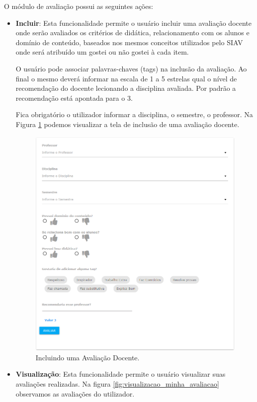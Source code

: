 \documentclass[12pt, a4paper]{report}
\begin{document}
O módulo de avaliação possui as seguintes ações:
\begin{itemize}
\item \textbf{Incluir}: Esta funcionalidade permite o usuário incluir uma avaliação docente onde serão avaliados os critérios de didática, relacionamento com os alunos e domínio de conteúdo, baseados nos mesmos conceitos utilizados pelo SIAV onde será atribuído um gostei ou não gostei à cada item.

O usuário pode associar palavras-chaves (tags) na inclusão da avaliação. Ao final o mesmo deverá informar na escala de 1 a 5 estrelas qual o nível de recomendação do docente lecionando a disciplina avaliada. Por padrão a recomendação está apontada para o 3. 

Fica obrigatório o utilizador informar a disciplina, o semestre, o professor. Na Figura \ref{fig:incluir_avaliacao}  podemos visualizar a tela de inclusão de uma avaliação docente.

\begin{figure}
\centering
\includegraphics[scale=0.5]{incluir_avaliacao.png}
\caption{Incluindo uma Avaliação Docente.}
\label{fig:incluir_avaliacao}
\end{figure}

\item \textbf{Visualização}: Esta funcionalidade permite o usuário visualizar suas avaliações realizadas. Na figura \ref{fig:visualizacao_minha_avaliacao} observamos as avaliações do utilizador.


\end{itemize}
\end{document}
